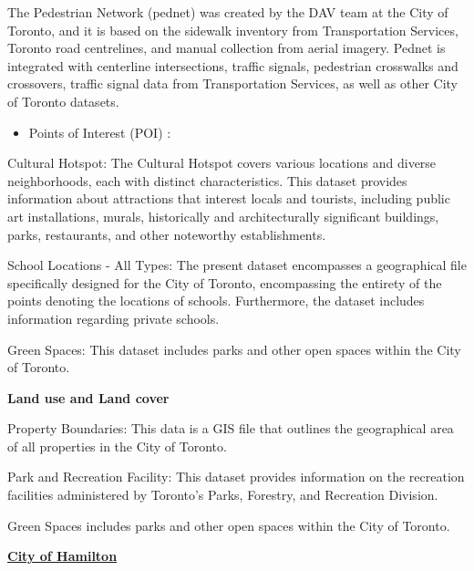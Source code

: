 \documentclass[12pt,twoside]{reedthesis}
\providecommand{\tightlist}{%
  \setlength{\itemsep}{0pt}\setlength{\parskip}{0pt}}
\begin{document}
The Pedestrian Network (pednet) was created by the DAV team at the City of Toronto, and it is based on the sidewalk inventory from Transportation Services, Toronto road centrelines, and manual collection from aerial imagery. Pednet is integrated with centerline intersections, traffic signals, pedestrian crosswalks and crossovers, traffic signal data from Transportation Services, as well as other City of Toronto datasets.
\begin{itemize}
\tightlist
\item
  Points of Interest (POI) :
\end{itemize}
Cultural Hotspot: The Cultural Hotspot covers various locations and diverse neighborhoods, each with distinct characteristics. This dataset provides information about attractions that interest locals and tourists, including public art installations, murals, historically and architecturally significant buildings, parks, restaurants, and other noteworthy establishments.

School Locations - All Types: The present dataset encompasses a geographical file specifically designed for the City of Toronto, encompassing the entirety of the points denoting the locations of schools. Furthermore, the dataset includes information regarding private schools.

Green Spaces: This dataset includes parks and other open spaces within the City of Toronto.

\textbf{Land use and Land cover}

Property Boundaries: This data is a GIS file that outlines the geographical area of all properties in the City of Toronto.

Park and Recreation Facility: This dataset provides information on the recreation facilities administered by Toronto's Parks, Forestry, and Recreation Division.

Green Spaces includes parks and other open spaces within the City of Toronto.

\textbf{\href{https://open.hamilton.ca/}{City of Hamilton}}
\end{document}
